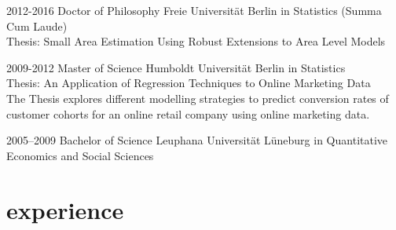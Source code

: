 \documentclass[]{friggeri-cv} %
\begin{document}
\begin{entrylist}


\entry
{2012-2016}
{Doctor {\normalfont of Philosophy}}
{Freie Universit\"at Berlin}
{in Statistics (Summa Cum Laude) \\ Thesis: Small Area Estimation Using Robust Extensions to Area Level Models}


\entry
{2009-2012}
{Master {\normalfont of Science}}
{Humboldt Universit\"at Berlin}
{in Statistics \\ Thesis: An Application of Regression Techniques to Online Marketing Data \\ The Thesis explores different modelling strategies to predict conversion rates of customer cohorts for an online retail company using online marketing data.}


\entry
{2005--2009}
{Bachelor {\normalfont of Science}}
{Leuphana Universit\"at L\"uneburg}
{in Quantitative Economics and Social Sciences}


\end{entrylist}


\section{experience}

\end{document}
